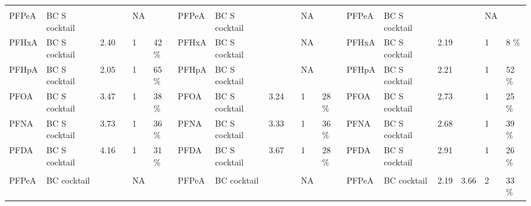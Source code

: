 \begin{sidewaystable}
{\begin{threeparttable}
\begin{tabular}{llllllllllllllllll}
         &                &        &           &    &                                &          &                &        &           &    &                                &          &                &        &           &    &                                \\
PFPeA    & BC S cocktail &        &           & NA &                                & PFPeA    & BC S cocktail &        &           & NA &                                & PFPeA    & BC S cocktail &        &           & NA &                                \\
PFHxA    & BC S cocktail & 2.40   &           & 1  & 42 \%                          & PFHxA    & BC S cocktail &        &           & NA &                                & PFHxA    & BC S cocktail & 2.19   &           & 1  & 8 \%                           \\
PFHpA    & BC S cocktail & 2.05   &           & 1  & 65 \%                          & PFHpA    & BC S cocktail &        &           & NA &                                & PFHpA    & BC S cocktail & 2.21   &           & 1  & 52 \%                          \\
PFOA     & BC S cocktail & 3.47   &           & 1  & 38 \%                          & PFOA     & BC S cocktail & 3.24   &           & 1  & 28 \%                          & PFOA     & BC S cocktail & 2.73   &           & 1  & 25 \%                          \\
PFNA     & BC S cocktail & 3.73   &           & 1  & 36 \%                          & PFNA     & BC S cocktail & 3.33   &           & 1  & 36 \%                          & PFNA     & BC S cocktail & 2.68   &           & 1  & 39 \%                          \\
PFDA     & BC S cocktail & 4.16   &           & 1  & 31 \%                          & PFDA     & BC S cocktail & 3.67   &           & 1  & 28 \%                          & PFDA     & BC S cocktail & 2.91   &           & 1  & 26 \%                          \\
         &                &        &           &    &                                &          &                &        &           &    &                                &          &                &        &           &    &                                \\
PFPeA    & BC cocktail   &        &           & NA &                                & PFPeA    & BC cocktail   &        &           & NA &                                & PFPeA    & BC cocktail   & 2.19   & 3.66      & 2  & 33 \%                          \\

\end{tabular}
\end{threeparttable}}
\end{sidewaystable}
